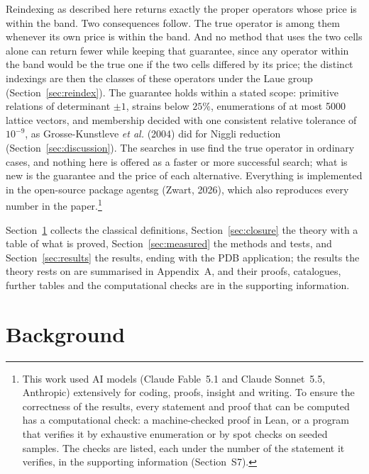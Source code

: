Reindexing as described here returns exactly the proper operators whose price is within the band. Two consequences follow. The true operator is among them whenever its own price is within the band. And no method that uses the two cells alone can return fewer while keeping that guarantee, since any operator within the band would be the true one if the two cells differed by its price; the distinct indexings are then the classes of these operators under the Laue group (Section~\ref{sec:reindex}). The guarantee holds within a stated scope: primitive relations of determinant $\pm1$, strains below $25\%$, enumerations of at most 5000 lattice vectors, and membership decided with one consistent relative tolerance of $10^{-9}$, as Grosse-Kunstleve \emph{et al.} (2004) did for Niggli reduction (Section~\ref{sec:discussion}). The searches in use find the true operator in ordinary cases, and nothing here is offered as a faster or more successful search; what is new is the guarantee and the price of each alternative. Everything is implemented in the open-source package agentsg (Zwart, 2026), which also reproduces every number in the paper.\footnote{This work used AI models (Claude Fable~5.1 and Claude Sonnet~5.5, Anthropic) extensively for coding, proofs, insight and writing. To ensure the correctness of the results, every statement and proof that can be computed has a computational check: a machine-checked proof in Lean, or a program that verifies it by exhaustive enumeration or by spot checks on seeded samples. The checks are listed, each under the number of the statement it verifies, in the supporting information (Section~S7).}

Section~\ref{sec:background} collects the classical definitions, Section~\ref{sec:closure} the theory with a table of what is proved, Section~\ref{sec:measured} the methods and tests, and Section~\ref{sec:results} the results, ending with the PDB application; the results the theory rests on are summarised in Appendix~A, and their proofs, catalogues, further tables and the computational checks are in the supporting information.

\section{Background}\label{sec:background}

